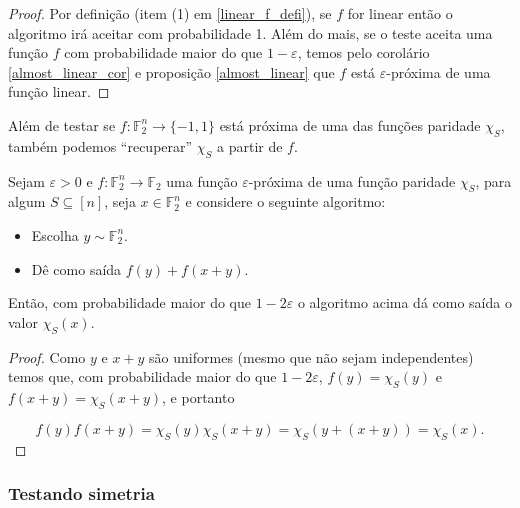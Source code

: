 \begin{proof}

Por definição (item (1) em \ref{linear_f_defi}), se $f$ for linear então o algoritmo irá aceitar com probabilidade 1. Além do mais, se o teste aceita uma função $f$ com probabilidade maior do que $1 - \varepsilon$, temos pelo corolário \ref{almost_linear_cor} e proposição \ref{almost_linear} que $f$ está $\varepsilon$-próxima de uma função linear.

\end{proof}

Além de testar se $f: \mathbb{F}_{2}^{n} \to \{-1, 1\}$ está próxima de uma das funções paridade $\chi_{S}$, também podemos ``recuperar'' $\chi_{S}$ a partir de $f$.

\begin{teo}

Sejam $\varepsilon > 0$ e $f: \mathbb{F}_{2}^{n} \to \mathbb{F}_{2}$ uma função $\varepsilon$-próxima de uma função paridade $\chi_{S}$, para algum $S \subseteq [n]$, seja $x \in \mathbb{F}_{2}^{n}$ e considere o seguinte algoritmo: 

\begin{itemize}

	\item Escolha $y \sim \mathbb{F}_{2}^{n}$.
	
	\item Dê como saída $f(y) + f(x + y)$.

\end{itemize}

Então, com probabilidade maior do que $1 - 2\varepsilon$ o algoritmo acima dá como saída o valor $\chi_{S}(x)$.

\end{teo}

\begin{proof}

Como $y$ e $x + y$ são uniformes (mesmo que não sejam independentes) temos que, com probabilidade maior do que $1 - 2\varepsilon$, $f(y) = \chi_{S}(y)$ e $f(x + y) = \chi_{S}(x + y)$, e portanto

\begin{equation*}
	f(y)f(x + y) = \chi_{S}(y)\chi_{S}(x + y) = \chi_{S}(y + (x + y)) = \chi_{S}(x).
\end{equation*}

\end{proof}

\subsubsection{Testando simetria}

